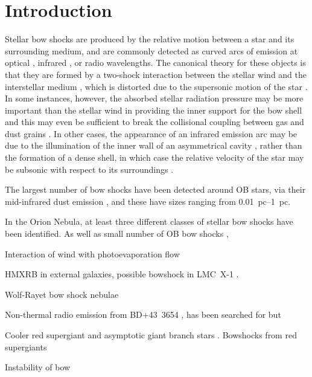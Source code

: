 
\section{Introduction}
\label{sec:introduction}

Stellar bow shocks are produced by the relative motion between a star
and its surrounding medium, and are commonly detected as curved arcs
of emission at optical \citep{Gull:1979a, Brown:2005a}, infrared
\citep{van-Buren:1988a, Kobulnicky:2016a}, or radio
\citep{van-Buren:1990a, Benaglia:2010a} wavelengths.  The canonical
theory for these objects is that they are formed by a two-shock
interaction between the stellar wind and the interstellar medium
\citep{Pikelner:1968a, Dyson:1972a}, which is distorted due to the
supersonic motion of the star \citep{Baranov:1970a, Wilkin:1996a}.  In
some instances, however, the absorbed stellar radiation pressure may
be more important than the stellar wind in providing the inner support
for the bow shell \citep[Paper~I]{Henney:2019a} and this may even be
sufficient to break the collisional coupling between gas and dust
grains \citep[Paper~II]{Henney:2019b}.  In other cases, the appearance
of an infrared emission arc may be due to the illumination of the
inner wall of an asymmetrical cavity \citep{Mackey:2016a}, rather than
the formation of a dense shell, in which case the relative velocity of
the star may be subsonic with respect to its surroundings
\citep{Mackey:2015a}.

The largest number of bow shocks have been detected around OB stars,
via their mid-infrared dust emission \citep{van-Buren:1995a,
  Smith:2005a, Povich:2008a, Kobulnicky:2010a, Peri:2012a, Peri:2015a,
  Sexton:2015b, Kobulnicky:2016a, Bodensteiner:2018a}, and these have
sizes ranging from \SIrange{0.01}{1}{pc}.  

In the Orion Nebula, at least three different classes of stellar bow
shocks have been identified. As well as small number of OB bow shocks \citep{Smith:2005a, ODell:2001c}, 

Interaction of wind with photoevaporation flow \citep{Dyson:1975a}

HMXRB in external galaxies, possible bowshock in LMC~X-1 \citep{Hyde:2017a}.

Wolf-Rayet bow shock nebulae \citep{Dyson:1989a}

Non-thermal radio emission from BD+43~3654 \citep{Benaglia:2010a}, has
been searched for but

Cooler red supergiant and asymptotic giant branch stars
\citep{Ueta:2008a, Sahai:2010a, Cox:2012a}. 
Bowshocks from red supergiants \citep{Meyer:2014a}


Instability of bow \citep{Blondin:1998a}

